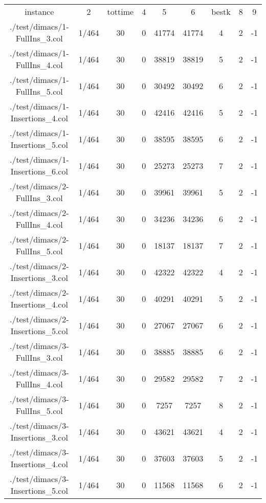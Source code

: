 \begin{table}[htb]
    \centering
    \begin{tabular}{@{}ccccccccc@{}}
        \toprule
        instance &  2 &  tottime &  4 &  5 &  6 &  bestk &  8 &  9 \\
        ./test/dimacs/1-FullIns\_3.col & 1/464 & 30 & 0 & 41774 & 41774 & 4 & 2 & -1 \\
        ./test/dimacs/1-FullIns\_4.col & 1/464 & 30 & 0 & 38819 & 38819 & 5 & 2 & -1 \\
        ./test/dimacs/1-FullIns\_5.col & 1/464 & 30 & 0 & 30492 & 30492 & 6 & 2 & -1 \\
        ./test/dimacs/1-Insertions\_4.col & 1/464 & 30 & 0 & 42416 & 42416 & 5 & 2 & -1 \\
        ./test/dimacs/1-Insertions\_5.col & 1/464 & 30 & 0 & 38595 & 38595 & 6 & 2 & -1 \\
        ./test/dimacs/1-Insertions\_6.col & 1/464 & 30 & 0 & 25273 & 25273 & 7 & 2 & -1 \\
        ./test/dimacs/2-FullIns\_3.col & 1/464 & 30 & 0 & 39961 & 39961 & 5 & 2 & -1 \\
        ./test/dimacs/2-FullIns\_4.col & 1/464 & 30 & 0 & 34236 & 34236 & 6 & 2 & -1 \\
        ./test/dimacs/2-FullIns\_5.col & 1/464 & 30 & 0 & 18137 & 18137 & 7 & 2 & -1 \\
        ./test/dimacs/2-Insertions\_3.col & 1/464 & 30 & 0 & 42322 & 42322 & 4 & 2 & -1 \\
        ./test/dimacs/2-Insertions\_4.col & 1/464 & 30 & 0 & 40291 & 40291 & 5 & 2 & -1 \\
        ./test/dimacs/2-Insertions\_5.col & 1/464 & 30 & 0 & 27067 & 27067 & 6 & 2 & -1 \\
        ./test/dimacs/3-FullIns\_3.col & 1/464 & 30 & 0 & 38885 & 38885 & 6 & 2 & -1 \\
        ./test/dimacs/3-FullIns\_4.col & 1/464 & 30 & 0 & 29582 & 29582 & 7 & 2 & -1 \\
        ./test/dimacs/3-FullIns\_5.col & 1/464 & 30 & 0 & 7257 & 7257 & 8 & 2 & -1 \\
        ./test/dimacs/3-Insertions\_3.col & 1/464 & 30 & 0 & 43621 & 43621 & 4 & 2 & -1 \\
        ./test/dimacs/3-Insertions\_4.col & 1/464 & 30 & 0 & 37603 & 37603 & 5 & 2 & -1 \\
        ./test/dimacs/3-Insertions\_5.col & 1/464 & 30 & 0 & 11568 & 11568 & 6 & 2 & -1 \\

\end{tabular}
\end{table}
